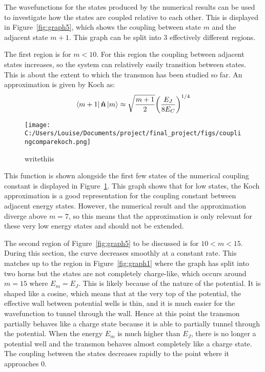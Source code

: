 \documentclass[11pt]{article}
\begin{document}
The wavefunctions for the states produced by the numerical results can be used to investigate how the states are coupled relative to each other. This is displayed in Figure~\ref{fig:graph5}, which shows the coupling between state $m$ and the adjacent state $m+1$. This graph can be split into 3 effectively different regions.

The first region is for $m<10$. For this region the coupling between adjacent states increases, so the system can relatively easily transition between states. This is about the extent to which the transmon has been studied so far. An approximation is given by Koch as:
\begin{equation} \label{eq:10}
\bra{m+1}\boldsymbol{\hat{n}}\ket{m} \approx \sqrt{\frac{m+1}{2}} \bigg( \frac{E_J}{8E_C}\bigg)^{1/4}
\end{equation}
\begin{figure}[ht]
\centering
\texttt{[image: C:/Users/Louise/Documents/project/final\_project/figs/couplingcomparekoch.png]}
\caption{writethiis}
\label{fig:graph7}
\end{figure}
This function is shown alongside the first few states of the numerical coupling constant is displayed in Figure~\ref{fig:graph7}. This graph shows that for low states, the Koch approximation is a good representation for the coupling constant between adjacent energy states. However, the numerical result and the approximation diverge above $m=7$, so this means that the approximation is only relevant for these very low energy states and should not be extended.

The second region of Figure~\ref{fig:graph5} to be discussed is for $10<m<15$. During this section, the curve decreases smoothly at a constant rate. This matches up to the region in Figure~\ref{fig:graph1} where the graph has split into two horns but the states are not completely charge-like, which occurs around $m=15$ where $E_m = E_J$. This is likely because of the nature of the potential. It is shaped like a cosine, which means that at the very top of the potential, the effective wall between potential wells is thin, and it is much easier for the wavefunction to tunnel through the wall. Hence at this point the transmon partially behaves like a charge state because it is able to partially tunnel through the potential. When the energy $E_m$ is much higher than $E_J$, there is no longer a potential well and the transmon behaves almost completely like a charge state. The coupling between the states decreases rapidly to the point where it approaches 0.
\end{document}
